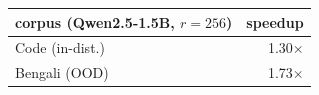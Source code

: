 \begin{tabular}{lr}
\toprule
corpus (Qwen2.5-1.5B, $r{=}256$) & speedup \\
\midrule
Code (in-dist.) & 1.30$\times$ \\
Bengali (OOD) & 1.73$\times$ \\
\bottomrule
\end{tabular}
